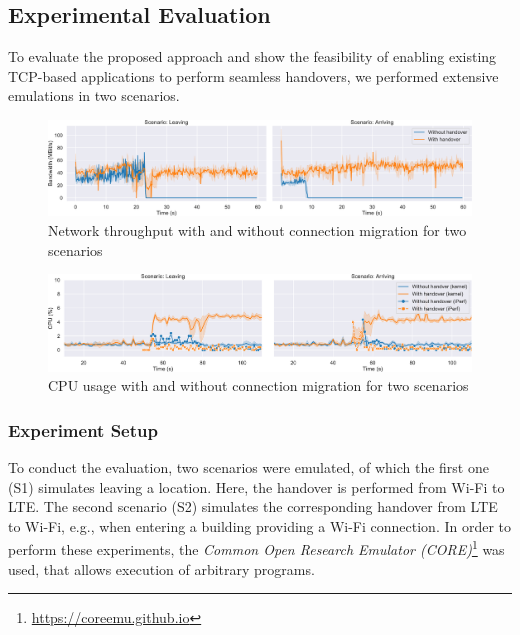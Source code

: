 \subsection{Experimental Evaluation}
To evaluate the proposed approach and show the feasibility of enabling existing TCP-based applications to perform seamless handovers, we performed extensive emulations in two scenarios.


\begin{figure}[tb]
    \centering
    \includegraphics[width=\textwidth]{figures/migration/wg_migration-network.pdf}
    \caption{Network throughput with and without connection migration for two scenarios}
    \label{fig:eval:mig:network}
\end{figure}
\begin{figure}[tb]
    \centering
    \includegraphics[width=\textwidth]{figures/migration/wg_migration-cpu.pdf}
    \caption{CPU usage with and without connection migration for two scenarios}
    \label{fig:eval:mig:cpu}
\end{figure}


\subsubsection{Experiment Setup}
To conduct the evaluation, two scenarios were emulated, of which the first one (S1) simulates leaving a location.
Here, the handover is performed from Wi-Fi to LTE.
The second scenario (S2) simulates the corresponding handover from LTE to Wi-Fi, e.g., when entering a building providing a Wi-Fi connection.
In order to perform these experiments, the \emph{Common Open Research Emulator (CORE)}\footnote{\url{https://coreemu.github.io}} was used, that allows execution of arbitrary programs.

